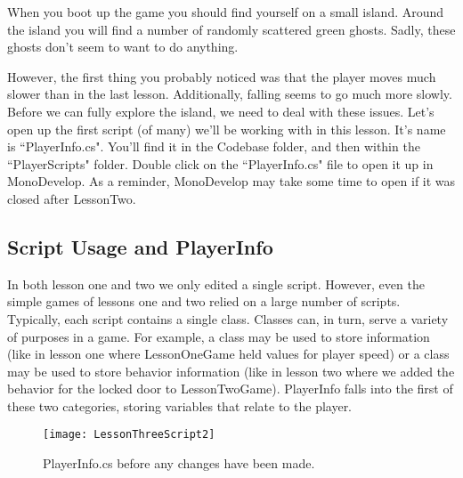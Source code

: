 \documentclass{article}
\begin{document}
When you boot up the game you should find yourself on a small island. Around the island you will find a number of randomly scattered green ghosts. Sadly, these ghosts don't seem to want to do anything. 

However, the first thing you probably noticed was that the player moves much slower than in the last lesson. Additionally, falling seems to go much more slowly. Before we can fully explore the island, we need to deal with these issues. Let's open up the first script (of many) we'll be working with in this lesson. It's name is ``PlayerInfo.cs". You'll find it in the Codebase folder, and then within the ``PlayerScripts" folder. Double click on the ``PlayerInfo.cs" file to open it up in MonoDevelop. As a reminder, MonoDevelop may take some time to open if it was closed after LessonTwo. 

\subsection{Script Usage and PlayerInfo}

In both lesson one and two we only edited a single script. However, even the simple games of lessons one and two relied on a large number of scripts. Typically, each script contains a single class. Classes can, in turn, serve a variety of purposes in a game. For example,  a class may be used to store information (like in lesson one where LessonOneGame held values for player speed) or a class may be used to store behavior information (like in lesson two where we added the behavior for the locked door to LessonTwoGame). PlayerInfo falls into the first of these two categories, storing variables that relate to the player.

\begin{figure}
  \texttt{[image: LessonThreeScript2]}
  \caption{PlayerInfo.cs before any changes have been made.}
  \label{fig:LessonThreeScript2}
\end{figure}
\end{document}
